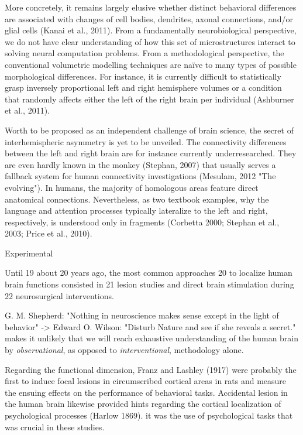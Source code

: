 \documentclass[authoryear,review,3p]{elsarticle}
\begin{document}
More concretely, it remains largely elusive whether distinct behavioral differences
are associated with changes of
cell bodies, dendrites, axonal connections, and/or glial cells
(Kanai et al., 2011).
%
From a fundamentally neurobiological perspective,
we do not have clear understanding of how
this set of microstructures interact to
solving neural computation problems.
From a methodological perspective,
the conventional volumetric modelling techniques are naïve to
many types of possible morphological differences.
For instance,
it is currently difficult to statistically grasp
inversely proportional left and right hemisphere volumes
or
a condition that randomly affects either the left of the right brain
per individual
(Ashburner et al., 2011).



Worth to be proposed as an independent challenge of
brain science, the secret of interhemispheric
asymmetry is yet to be unveiled.
The connectivity differences between the left and right brain are
for instance currently underresearched.
They are even hardly known in the monkey (Stephan, 2007)
that usually serves a fallback system for human
connectivity investigations (Mesulam, 2012 "The evolving").
In humans, the majority of homologous areas feature
direct anatomical connections.
Nevertheless, as two textbook examples,
why the language and attention processes typically lateralize to
the left and right, respectively,
is understood only in fragments
(Corbetta 2000; Stephan et al., 2003; Price et al., 2010).







Experimental

Until
19 about 20 years ago, the most common approaches
20 to localize human brain functions consisted in
21 lesion studies and direct brain stimulation during
22 neurosurgical interventions. 

G. M. Shepherd: "Nothing in neuroscience makes sense except in the light of behavior"
->
Edward O. Wilson: "Disturb Nature and see if she reveals a secret."
makes it unlikely that we will reach exhaustive understanding of
the human brain by
\textit{observational}, as opposed to \textit{interventional}, methodology
alone.

Regarding the functional dimension, Franz and Lashley (1917) were probably the first to induce focal lesions in circumscribed cortical areas in rats and measure the ensuing effects on the performance of behavioral tasks. Accidental lesion in the human brain likewise provided hints regarding the cortical localization of psychological processes (Harlow 1869). 
it was the use of psychological tasks that was crucial in these studies.
\end{document}
